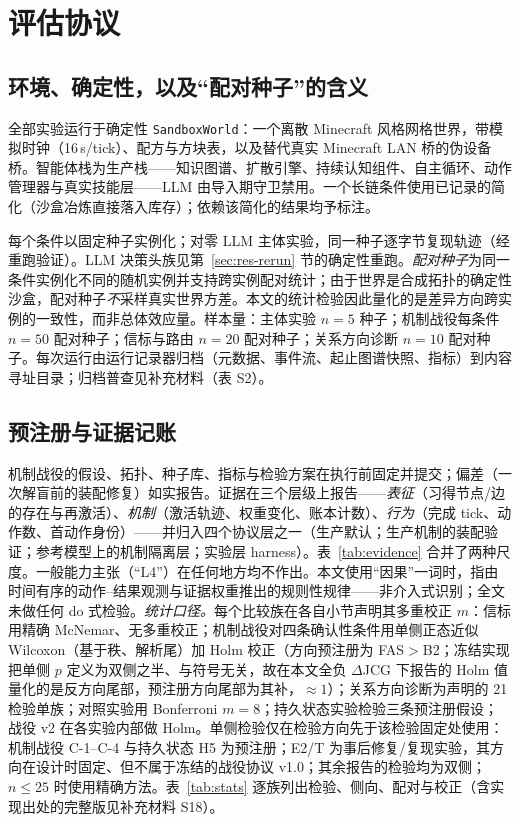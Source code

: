 \documentclass[10pt,a4paper]{ctexart}
\begin{document}
\section{评估协议}
\label{sec:method}

\subsection{环境、确定性，以及“配对种子”的含义}
\label{sec:method-env}
全部实验运行于确定性 \texttt{SandboxWorld}：一个离散 Minecraft 风格网格世界，带模拟时钟（16\,s/tick）、配方与方块表，以及替代真实 Minecraft LAN 桥的伪设备桥。智能体栈为生产栈——知识图谱、扩散引擎、持续认知组件、自主循环、动作管理器与真实技能层——LLM 由导入期守卫禁用。一个长链条件使用已记录的简化（沙盒冶炼直接落入库存）；依赖该简化的结果均予标注。

每个条件以固定种子实例化；对零 LLM 主体实验，同一种子逐字节复现轨迹（经重跑验证）。LLM 决策头族见第~\ref{sec:res-rerun} 节的确定性重跑。\emph{配对种子}为同一条件实例化不同的随机实例并支持跨实例配对统计；由于世界是合成拓扑的确定性沙盒，配对种子\emph{不}采样真实世界方差。本文的统计检验因此量化的是差异方向跨实例的一致性，而非总体效应量。样本量：主体实验 $n{=}5$ 种子；机制战役每条件 $n{=}50$ 配对种子；信标与路由 $n{=}20$ 配对种子；关系方向诊断 $n{=}10$ 配对种子。每次运行由运行记录器归档（元数据、事件流、起止图谱快照、指标）到内容寻址目录；归档普查见补充材料（表 S2）。

\subsection{预注册与证据记账}
\label{sec:method-prereg}
机制战役的假设、拓扑、种子库、指标与检验方案在执行前固定并提交；偏差（一次解盲前的装配修复）如实报告。证据在三个层级上报告——\emph{表征}（习得节点/边的存在与再激活）、\emph{机制}（激活轨迹、权重变化、账本计数）、\emph{行为}（完成 tick、动作数、首动作身份）——并归入四个协议层之一（生产默认；生产机制的装配验证；参考模型上的机制隔离层；实验层 harness）。表~\ref{tab:evidence} 合并了两种尺度。一般能力主张（“L4”）在任何地方均不作出。本文使用“因果”一词时，指由时间有序的动作--结果观测与证据权重推出的规则性规律——非介入式识别；全文未做任何 do 式检验。\emph{统计口径。}每个比较族在各自小节声明其多重校正 $m$：信标用精确 McNemar、无多重校正；机制战役对四条确认性条件用单侧正态近似 Wilcoxon（基于秩、解析尾）加 Holm 校正（方向预注册为 FAS${>}$B2；冻结实现把单侧 $p$ 定义为双侧之半、与符号无关，故在本文全负 $\Delta$JCG 下报告的 Holm 值量化的是反方向尾部，预注册方向尾部为其补，${\approx}1$）；关系方向诊断为声明的 21 检验单族；对照实验用 Bonferroni $m{=}8$；持久状态实验检验三条预注册假设；战役 v2 在各实验内部做 Holm。单侧检验仅在检验方向先于该检验固定处使用：机制战役 C-1--C-4 与持久状态 H5 为预注册；E2/T 为事后修复/复现实验，其方向在设计时固定、但不属于冻结的战役协议 v1.0；其余报告的检验均为双侧；$n{\le}25$ 时使用精确方法。表~\ref{tab:stats} 逐族列出检验、侧向、配对与校正（含实现出处的完整版见补充材料 S18）。
\end{document}
